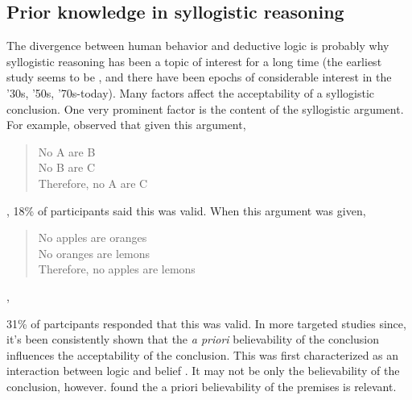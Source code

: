\documentclass{llncs} %
\begin{document}
\subsection{Prior knowledge in syllogistic reasoning}

The divergence between human behavior and deductive logic is probably why syllogistic reasoning has been a topic of interest for a long time (the earliest study seems to be , and there have been epochs of considerable interest in the '30s, '50s, '70s-today). Many factors affect the acceptability of a syllogistic conclusion. One very prominent factor is the content of the syllogistic argument. For example,  observed that given this argument,

\begin{quote}
No A are B\\
No B are C\\
Therefore, no A are C
\end{quote}

, 18\% of participants said this was valid. When this argument was given,

\begin{quote}
No apples are oranges\\
No oranges are lemons\\
Therefore, no apples are lemons
\end{quote},

31\% of partcipants responded that this was valid. In more targeted studies since, it's been consistently shown that the \emph{a priori} believability of the conclusion influences the acceptability of the conclusion. This was first characterized as an interaction between logic and belief \cite{Evans1983}. It may not be only the believability of the conclusion, however.  found the a priori believability of the premises is relevant. 

\end{document}
